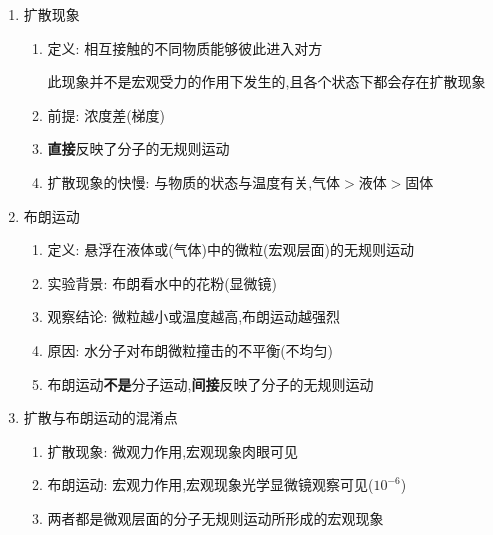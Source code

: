 \documentclass{article}
\begin{document}
\begin{enumerate}
    \item 扩散现象
          \begin{enumerate}[label = (\arabic*)]
              \item 定义: 相互接触的不同物质能够彼此进入对方

                    \hspace{2.7em}此现象并不是宏观受力的作用下发生的,且各个状态下都会存在扩散现象
              \item 前提: 浓度差(梯度)
              \item \textbf{直接}反映了分子的无规则运动
              \item 扩散现象的快慢: 与物质的状态与温度有关,气体$>$液体$>$固体
          \end{enumerate}
    \item 布朗运动
          \begin{enumerate}[label = (\arabic*)]
              \item 定义: 悬浮在液体或(气体)中的微粒(宏观层面)的无规则运动
              \item 实验背景: 布朗看水中的花粉(显微镜)
              \item 观察结论: 微粒越小或温度越高,布朗运动越强烈
              \item 原因: 水分子对布朗微粒撞击的不平衡(不均匀)
              \item 布朗运动\textbf{不是}分子运动,\textbf{间接}反映了分子的无规则运动
          \end{enumerate}
    \item 扩散与布朗运动的混淆点
          \begin{enumerate}[label = (\arabic*)]
              \item 扩散现象: 微观力作用,宏观现象肉眼可见
              \item 布朗运动: 宏观力作用,宏观现象光学显微镜观察可见($10^{-6}$)
              \item 两者都是微观层面的分子无规则运动所形成的宏观现象
          \end{enumerate}
\end{enumerate}

\vspace{2em}
\end{document}

